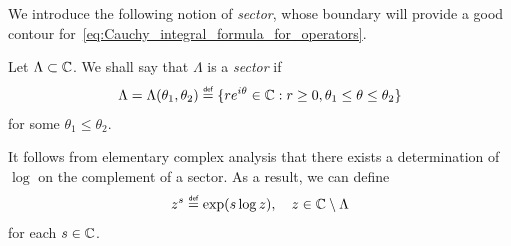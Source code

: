 We introduce the following notion of \emph{sector},
whose boundary will provide a good contour for~\eqref{eq:Cauchy_integral_formula_for_operators}.

\begin{definition}[Sector]
    Let $\Lambda \subset \mathbb{C}$.
    We shall say that $\Lambda$ is a \emph{sector} if
    \begin{align*}
        \Lambda
        = \Lambda(\theta_1, \theta_2)
        \defeq \{r \e^{\i \theta} \in \C : r \geq 0, \theta_1 \leq \theta \leq \theta_2\}
    \end{align*}
    for some $\theta_1 \leq \theta_2$.
\end{definition}

It follows from elementary complex analysis that there exists a determination of $\log$ on the complement of a sector.
As a result,
we can define
\begin{align*}
    z^s \defeq \exp (s \log z),
    \quad z \in \C \setminus \Lambda
\end{align*}
for each $s \in \mathbb{C}$.

